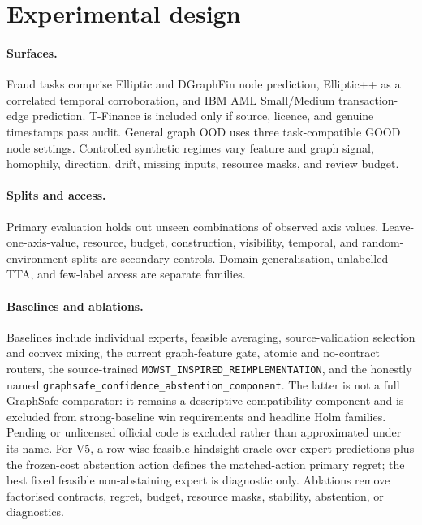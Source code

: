 \section{Experimental design}

\paragraph{Surfaces.}
Fraud tasks comprise Elliptic and DGraphFin node prediction, Elliptic++ as a
correlated temporal corroboration, and IBM AML Small/Medium transaction-edge
prediction. T-Finance is included only if source, licence, and genuine
timestamps pass audit. General graph OOD uses three task-compatible GOOD node
settings. Controlled synthetic regimes vary feature and graph signal,
homophily, direction, drift, missing inputs, resource masks, and review budget.

\paragraph{Splits and access.}
Primary evaluation holds out unseen combinations of observed axis values.
Leave-one-axis-value, resource, budget, construction, visibility, temporal, and
random-environment splits are secondary controls. Domain generalisation,
unlabelled TTA, and few-label access are separate families.

\paragraph{Baselines and ablations.}
Baselines include individual experts, feasible averaging, source-validation
selection and convex mixing, the current graph-feature gate, atomic and
no-contract routers, the source-trained
\texttt{MOWST\_\allowbreak{}INSPIRED\_\allowbreak{}REIMPLEMENTATION}, and the
honestly named
\texttt{graphsafe\_\allowbreak{}confidence\_\allowbreak{}abstention\_\allowbreak{}component}.
The latter is not a full GraphSafe comparator: it remains a descriptive
compatibility component and is excluded from strong-baseline win requirements
and headline Holm families. Pending or unlicensed official code is excluded
rather than approximated under its name. For V5, a row-wise feasible hindsight
oracle over expert predictions plus the frozen-cost abstention action defines
the matched-action primary regret; the best fixed feasible non-abstaining
expert is diagnostic only.
Ablations remove factorised contracts, regret, budget, resource masks,
stability, abstention, or diagnostics.

